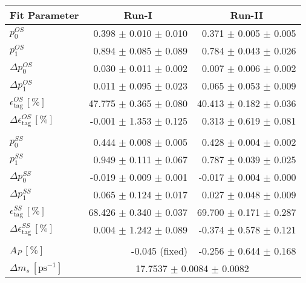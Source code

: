 \begin{tabular}{l r r } 
\hline
\hline
\multicolumn{1}{c}{Fit Parameter} & \multicolumn{1}{c}{Run-I} & \multicolumn{1}{c}{Run-II}  \\ 
\hline
$p_{0}^{OS}$ & 0.398 $\pm$ 0.010 $\pm$ 0.010 & 0.371 $\pm$ 0.005 $\pm$ 0.005 \\ 
$p_{1}^{OS}$ & 0.894 $\pm$ 0.085 $\pm$ 0.089 & 0.784 $\pm$ 0.043 $\pm$ 0.026 \\ 
$\Delta p_{0}^{OS}$ & 0.030 $\pm$ 0.011 $\pm$ 0.002 & 0.007 $\pm$ 0.006 $\pm$ 0.002 \\ 
$\Delta p_{1}^{OS}$ & 0.011 $\pm$ 0.095 $\pm$ 0.023 & 0.065 $\pm$ 0.053 $\pm$ 0.009 \\ 
$\epsilon_{\text{tag}}^{OS} \, [\%]$ & 47.775 $\pm$ 0.365 $\pm$ 0.080 & 40.413 $\pm$ 0.182 $\pm$ 0.036 \\ 
$\Delta \epsilon_{\text{tag}}^{OS} \, [\%]$ & -0.001 $\pm$ 1.353 $\pm$ 0.125 & 0.313 $\pm$ 0.619 $\pm$ 0.081 \\ 
 \\ 
$p_{0}^{SS}$ & 0.444 $\pm$ 0.008 $\pm$ 0.005 & 0.428 $\pm$ 0.004 $\pm$ 0.002 \\ 
$p_{1}^{SS}$ & 0.949 $\pm$ 0.111 $\pm$ 0.067 & 0.787 $\pm$ 0.039 $\pm$ 0.025 \\ 
$\Delta p_{0}^{SS}$ & -0.019 $\pm$ 0.009 $\pm$ 0.001 & -0.017 $\pm$ 0.004 $\pm$ 0.000 \\ 
$\Delta p_{1}^{SS}$ & 0.065 $\pm$ 0.124 $\pm$ 0.017 & 0.027 $\pm$ 0.048 $\pm$ 0.009 \\ 
$\epsilon_{\text{tag}}^{SS} \, [\%]$ & 68.426 $\pm$ 0.340 $\pm$ 0.037 & 69.700 $\pm$ 0.171 $\pm$ 0.287 \\ 
$\Delta \epsilon_{\text{tag}}^{SS} \, [\%]$ & 0.004 $\pm$ 1.242 $\pm$ 0.089 & -0.374 $\pm$ 0.578 $\pm$ 0.121 \\ 
 \\ 
$A_{P} \, [\%]$ & -0.045 (fixed) & -0.256 $\pm$ 0.644 $\pm$ 0.168 \\ 
\hline
$\Delta m_{s} \, [\text{ps}^{-1}]$ & \multicolumn{2}{c}{ 17.7537 $\pm$ 0.0084 $\pm$ 0.0082 }  \\ 
\hline
\hline
\end{tabular}
